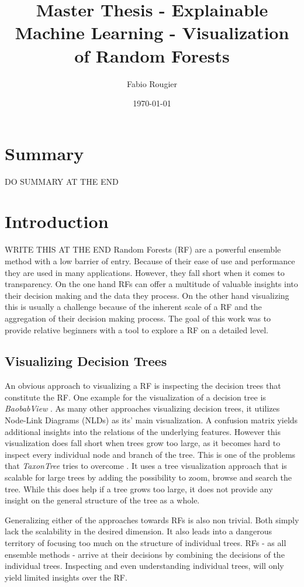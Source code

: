 \documentclass[a4paper, 12pt]{article}
\title{Master Thesis - Explainable Machine Learning - Visualization of Random Forests}
\author{Fabio Rougier}
\date{\today}
\begin{document}
\maketitle

\clearpage
\section{Summary}
DO SUMMARY AT THE END

\tableofcontents
\clearpage

\section{Introduction}
WRITE THIS AT THE END
Random Forests (RF) \cite{breiman2001random} are a powerful ensemble method with a low barrier of entry. Because of their
ease of use and performance they are used in many applications. However, they fall short
when it comes to transparency.
On the one hand RFs can offer a multitude of valuable insights into their decision making and the data they
process. On the other hand visualizing this is usually a challenge because of the inherent scale of a RF and the
aggregation of their decision making process. The goal of this work was to provide relative
beginners with a tool to explore a RF on a detailed level.

\subsection{Visualizing Decision Trees}
An obvious approach to visualizing a RF is inspecting the decision trees that constitute
the RF. One example for the visualization of a decision tree is \textit{BaobabView}
\cite{van2011baobabview}. As many other approaches visualizing decision trees, it utilizes
Node-Link Diagrams (NLDs) as its' main visualization. A confusion matrix yields additional
insights into the relations of the underlying features.
However this visualization does fall short when trees grow too large, as it becomes hard to
inspect every individual node and branch of the tree.
This is one of the problems that \textit{TaxonTree} tries to overcome
\cite{parr2003taxontree}. It uses a tree visualization approach that is scalable for large
trees by adding the possibility to zoom, browse and search the tree. While this does
help if a tree grows too large, it does not provide any insight on the general structure of
the tree as a whole. \par

Generalizing either of the approaches towards RFs is also non trivial. Both simply lack the
scalability in the desired dimension. It also leads into a dangerous territory of focusing too much on
the structure of individual trees. RFs - as all ensemble methods - arrive at their decisions
by combining the decisions of the individual trees. Inspecting and even understanding
individual trees, will only yield limited insights over the RF.
\end{document}
